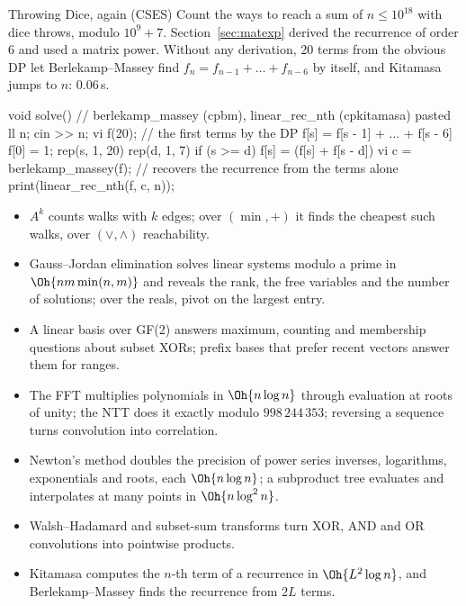 \begin{problem}{Throwing Dice, again (CSES)}
Count the ways to reach a sum of $n \le 10^{18}$ with dice throws, modulo $10^9 + 7$.
\solution Section~\ref{sec:matexp} derived the recurrence of order 6 and used a matrix power. Without any derivation, 20 terms from the
obvious DP let Berlekamp--Massey find $f_n = f_{n-1} + \dots + f_{n-6}$ by itself, and Kitamasa jumps to $n$: 0.06\,s.
\end{problem}

\begin{code}
void solve() {  // berlekamp_massey (cpbm), linear_rec_nth (cpkitamasa) pasted
    ll n;
    cin >> n;
    vi f(20);  // the first terms by the DP f[s] = f[s - 1] + ... + f[s - 6]
    f[0] = 1;
    rep(s, 1, 20) rep(d, 1, 7) if (s >= d) f[s] = (f[s] + f[s - d]) %
    vi c = berlekamp_massey(f);  // recovers the recurrence from the terms alone
    print(linear_rec_nth(f, c, n));
}
\end{code}

\begin{summary}
\begin{itemize}
  \item $A^k$ counts walks with $k$ edges; over $(\min, +)$ it finds the cheapest such walks, over $(\lor, \land)$ reachability.
  \item Gauss--Jordan elimination solves linear systems modulo a prime in $\Oh{nm \min(n, m)}$ and reveals the rank, the free variables
        and the number of solutions; over the reals, pivot on the largest entry.
  \item A linear basis over GF(2) answers maximum, counting and membership questions about subset XORs; prefix bases that prefer recent
        vectors answer them for ranges.
  \item The FFT multiplies polynomials in $\Oh{n \log n}$ through evaluation at roots of unity; the NTT does it exactly modulo
        $998\,244\,353$; reversing a sequence turns convolution into correlation.
  \item Newton's method doubles the precision of power series inverses, logarithms, exponentials and roots, each $\Oh{n \log n}$; a
        subproduct tree evaluates and interpolates at many points in $\Oh{n \log^2 n}$.
  \item Walsh--Hadamard and subset-sum transforms turn XOR, AND and OR convolutions into pointwise products.
  \item Kitamasa computes the $n$-th term of a recurrence in $\Oh{L^2 \log n}$, and Berlekamp--Massey finds the recurrence from $2L$
        terms.
\end{itemize}
\end{summary}


